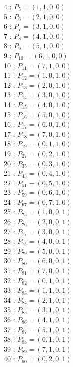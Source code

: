 \documentclass{article}
\begin{document}
{\begin{multicols}{3}
4 : $P_{5}=( 1, 1, 0, 0 )$\\
5 : $P_{6}=( 2, 1, 0, 0 )$\\
6 : $P_{7}=( 3, 1, 0, 0 )$\\
7 : $P_{8}=( 4, 1, 0, 0 )$\\
8 : $P_{9}=( 5, 1, 0, 0 )$\\
9 : $P_{10}=( 6, 1, 0, 0 )$\\
10 : $P_{11}=( 7, 1, 0, 0 )$\\
11 : $P_{12}=( 1, 0, 1, 0 )$\\
12 : $P_{13}=( 2, 0, 1, 0 )$\\
13 : $P_{14}=( 3, 0, 1, 0 )$\\
14 : $P_{15}=( 4, 0, 1, 0 )$\\
15 : $P_{16}=( 5, 0, 1, 0 )$\\
16 : $P_{17}=( 6, 0, 1, 0 )$\\
17 : $P_{18}=( 7, 0, 1, 0 )$\\
18 : $P_{19}=( 0, 1, 1, 0 )$\\
19 : $P_{27}=( 0, 2, 1, 0 )$\\
20 : $P_{35}=( 0, 3, 1, 0 )$\\
21 : $P_{43}=( 0, 4, 1, 0 )$\\
22 : $P_{51}=( 0, 5, 1, 0 )$\\
23 : $P_{59}=( 0, 6, 1, 0 )$\\
24 : $P_{67}=( 0, 7, 1, 0 )$\\
25 : $P_{75}=( 1, 0, 0, 1 )$\\
26 : $P_{76}=( 2, 0, 0, 1 )$\\
27 : $P_{77}=( 3, 0, 0, 1 )$\\
28 : $P_{78}=( 4, 0, 0, 1 )$\\
29 : $P_{79}=( 5, 0, 0, 1 )$\\
30 : $P_{80}=( 6, 0, 0, 1 )$\\
31 : $P_{81}=( 7, 0, 0, 1 )$\\
32 : $P_{82}=( 0, 1, 0, 1 )$\\
33 : $P_{83}=( 1, 1, 0, 1 )$\\
34 : $P_{84}=( 2, 1, 0, 1 )$\\
35 : $P_{85}=( 3, 1, 0, 1 )$\\
36 : $P_{86}=( 4, 1, 0, 1 )$\\
37 : $P_{87}=( 5, 1, 0, 1 )$\\
38 : $P_{88}=( 6, 1, 0, 1 )$\\
39 : $P_{89}=( 7, 1, 0, 1 )$\\
40 : $P_{90}=( 0, 2, 0, 1 )$\\

\end{multicols}}
\end{document}

